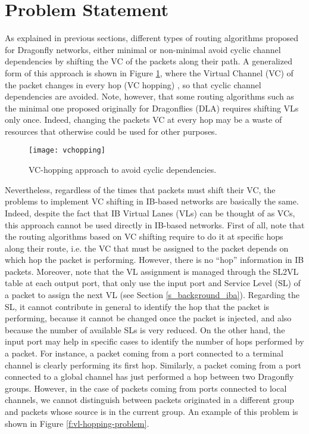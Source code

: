 \documentclass[review]{elsarticle}
\newcommand{\dflys}{Dragonflies}
\newcommand{\dfly}{Dragonfly}
\newcommand{\ib}{IB}
\begin{document}
\section{Problem Statement}
\label{s_problem_statement} 

As explained in previous sections, different types of routing algorithms proposed for \dfly{} networks, either minimal or non-minimal
avoid cyclic channel dependencies by shifting the VC of the packets along their path.
A generalized form of this approach is shown in Figure \ref{f:vchopping}, where the Virtual Channel (VC) of the packet changes in every hop (VC hopping) \cite{scherson1994},
so that cyclic channel dependencies are avoided.
Note, however, that some routing algorithms such as the minimal one proposed originally for \dflys{} (DLA) requires shifting VLs only once.
Indeed, changing the packets VC at every hop may be a waste of resources that otherwise could be used for other purposes.

\begin{figure}[!htb]
	\centering
	\texttt{[image: vchopping]}
	\caption{VC-hopping approach to avoid cyclic dependencies.}
	\label{f:vchopping}
\end{figure}

Nevertheless, regardless of the times that packets must shift their VC, the problems to implement VC shifting in \ib-based networks are basically the same.
Indeed, despite the fact that \ib{} Virtual Lanes (VLs) can be thought of as VCs, this approach cannot be used directly in \ib-based networks.
First of all, note that the routing algorithms based on VC shifting require to do it at specific hops along their route, i.e. the VC that 
must be assigned to the packet depends on which hop the packet is performing.
However, there is no ``hop'' information in \ib{} packets.
Moreover, note that the VL assignment is managed through the SL2VL table at each output port, that only use the input port and
Service Level (SL) of a packet to assign the next VL (see Section \ref{s_background_iba}).
Regarding the SL, it cannot contribute in general to identify the hop that the packet is performing, because it cannot be changed once
the packet is injected, and also because the number of available SLs is very reduced.
On the other hand, the input port may help in specific cases to identify the number of hops performed by a packet.
For instance, a packet coming from a port connected to a terminal channel is clearly performing its first hop.
Similarly, a packet coming from a port connected to a global channel has just performed a hop between two \dfly{} groups.
However, in the case of packets coming from ports connected to local channels, we cannot distinguish between packets
originated in a different group and packets whose source is in the current group.
An example of this problem is shown in Figure \ref{f:vl-hopping-problem}.
\end{document}

